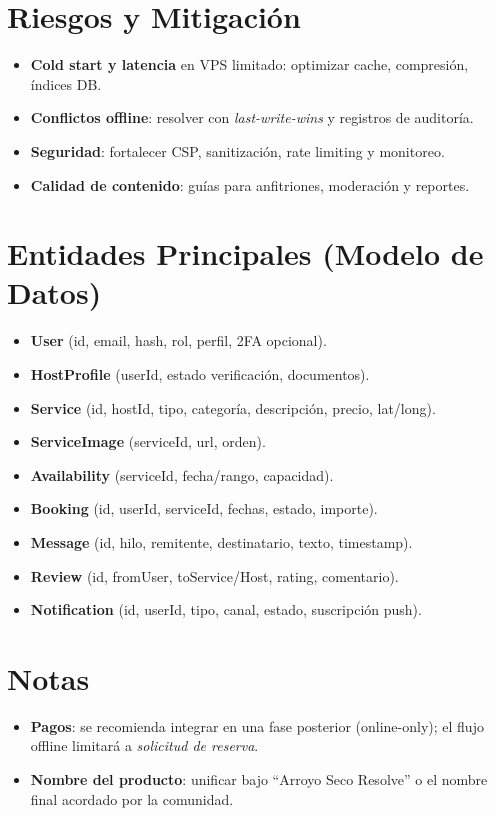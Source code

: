 \documentclass[12pt]{article}
\begin{document}
\section{Riesgos y Mitigación}
\begin{itemize}[left=0pt, itemsep=4pt]
  \item \textbf{Cold start y latencia} en VPS limitado: optimizar cache, compresión, índices DB.
  \item \textbf{Conflictos offline}: resolver con \textit{last-write-wins} y registros de auditoría.
  \item \textbf{Seguridad}: fortalecer CSP, sanitización, rate limiting y monitoreo.
  \item \textbf{Calidad de contenido}: guías para anfitriones, moderación y reportes.
\end{itemize}

\section{Entidades Principales (Modelo de Datos)}
\begin{itemize}[left=0pt, itemsep=2pt]
  \item \textbf{User} (id, email, hash, rol, perfil, 2FA opcional).
  \item \textbf{HostProfile} (userId, estado verificación, documentos).
  \item \textbf{Service} (id, hostId, tipo, categoría, descripción, precio, lat/long).
  \item \textbf{ServiceImage} (serviceId, url, orden).
  \item \textbf{Availability} (serviceId, fecha/rango, capacidad).
  \item \textbf{Booking} (id, userId, serviceId, fechas, estado, importe).
  \item \textbf{Message} (id, hilo, remitente, destinatario, texto, timestamp).
  \item \textbf{Review} (id, fromUser, toService/Host, rating, comentario).
  \item \textbf{Notification} (id, userId, tipo, canal, estado, suscripción push).
\end{itemize}

\section{Notas}
\begin{itemize}[left=0pt, itemsep=4pt]
  \item \textbf{Pagos}: se recomienda integrar en una fase posterior (online-only); el flujo offline limitará a \emph{solicitud de reserva}.
  \item \textbf{Nombre del producto}: unificar bajo ``Arroyo Seco Resolve'' o el nombre final acordado por la comunidad.
\end{itemize}
\end{document}

